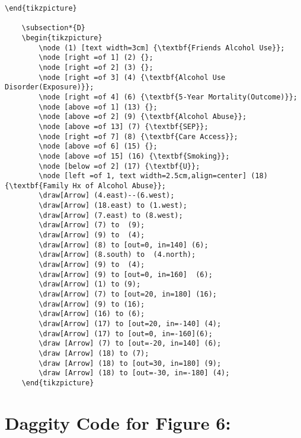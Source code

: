 \documentclass{article}
\begin{document}
\begin{lstlisting}[frame=single, basicstyle=\ttfamily]
    \end{tikzpicture}
    
    \subsection*{D}
    \begin{tikzpicture}
        \node (1) [text width=3cm] {\textbf{Friends Alcohol Use}};
        \node [right =of 1] (2) {};
        \node [right =of 2] (3) {};
        \node [right =of 3] (4) {\textbf{Alcohol Use Disorder(Exposure)}};
        \node [right =of 4] (6) {\textbf{5-Year Mortality(Outcome)}};
        \node [above =of 1] (13) {};
        \node [above =of 2] (9) {\textbf{Alcohol Abuse}};
        \node [above =of 13] (7) {\textbf{SEP}};
        \node [right =of 7] (8) {\textbf{Care Access}};
        \node [above =of 6] (15) {};
        \node [above =of 15] (16) {\textbf{Smoking}};
        \node [below =of 2] (17) {\textbf{U}};
        \node [left =of 1, text width=2.5cm,align=center] (18) {\textbf{Family Hx of Alcohol Abuse}};
        \draw[Arrow] (4.east)--(6.west);
        \draw[Arrow] (18.east) to (1.west);
        \draw[Arrow] (7.east) to (8.west);
        \draw[Arrow] (7) to  (9);
        \draw[Arrow] (9) to  (4);
        \draw[Arrow] (8) to [out=0, in=140] (6);
        \draw[Arrow] (8.south) to  (4.north);
        \draw[Arrow] (9) to  (4);
        \draw[Arrow] (9) to [out=0, in=160]  (6);
        \draw[Arrow] (1) to (9);
        \draw[Arrow] (7) to [out=20, in=180] (16);
        \draw[Arrow] (9) to (16);
        \draw[Arrow] (16) to (6);
        \draw[Arrow] (17) to [out=20, in=-140] (4);
        \draw[Arrow] (17) to [out=0, in=-160](6);
        \draw [Arrow] (7) to [out=-20, in=140] (6);
        \draw [Arrow] (18) to (7);
        \draw [Arrow] (18) to [out=30, in=180] (9);
        \draw [Arrow] (18) to [out=-30, in=-180] (4);
    \end{tikzpicture}
\end{lstlisting}

\section*{Daggity Code for Figure 6:}
\begin{lstlisting}[frame=single, basicstyle=\ttfamily]

\end{lstlisting}

    
\end{document}

